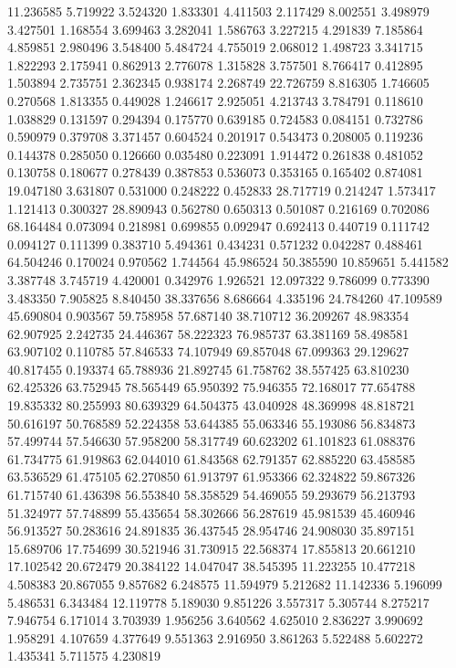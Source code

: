 11.236585
5.719922
3.524320
1.833301
4.411503
2.117429
8.002551
3.498979
3.427501
1.168554
3.699463
3.282041
1.586763
3.227215
4.291839
7.185864
4.859851
2.980496
3.548400
5.484724
4.755019
2.068012
1.498723
3.341715
1.822293
2.175941
0.862913
2.776078
1.315828
3.757501
8.766417
0.412895
1.503894
2.735751
2.362345
0.938174
2.268749
22.726759
8.816305
1.746605
0.270568
1.813355
0.449028
1.246617
2.925051
4.213743
3.784791
0.118610
1.038829
0.131597
0.294394
0.175770
0.639185
0.724583
0.084151
0.732786
0.590979
0.379708
3.371457
0.604524
0.201917
0.543473
0.208005
0.119236
0.144378
0.285050
0.126660
0.035480
0.223091
1.914472
0.261838
0.481052
0.130758
0.180677
0.278439
0.387853
0.536073
0.353165
0.165402
0.874081
19.047180
3.631807
0.531000
0.248222
0.452833
28.717719
0.214247
1.573417
1.121413
0.300327
28.890943
0.562780
0.650313
0.501087
0.216169
0.702086
68.164484
0.073094
0.218981
0.699855
0.092947
0.692413
0.440719
0.111742
0.094127
0.111399
0.383710
5.494361
0.434231
0.571232
0.042287
0.488461
64.504246
0.170024
0.970562
1.744564
45.986524
50.385590
10.859651
5.441582
3.387748
3.745719
4.420001
0.342976
1.926521
12.097322
9.786099
0.773390
3.483350
7.905825
8.840450
38.337656
8.686664
4.335196
24.784260
47.109589
45.690804
0.903567
59.758958
57.687140
38.710712
36.209267
48.983354
62.907925
2.242735
24.446367
58.222323
76.985737
63.381169
58.498581
63.907102
0.110785
57.846533
74.107949
69.857048
67.099363
29.129627
40.817455
0.193374
65.788936
21.892745
61.758762
38.557425
63.810230
62.425326
63.752945
78.565449
65.950392
75.946355
72.168017
77.654788
19.835332
80.255993
80.639329
64.504375
43.040928
48.369998
48.818721
50.616197
50.768589
52.224358
53.644385
55.063346
55.193086
56.834873
57.499744
57.546630
57.958200
58.317749
60.623202
61.101823
61.088376
61.734775
61.919863
62.044010
61.843568
62.791357
62.885220
63.458585
63.536529
61.475105
62.270850
61.913797
61.953366
62.324822
59.867326
61.715740
61.436398
56.553840
58.358529
54.469055
59.293679
56.213793
51.324977
57.748899
55.435654
58.302666
56.287619
45.981539
45.460946
56.913527
50.283616
24.891835
36.437545
28.954746
24.908030
35.897151
15.689706
17.754699
30.521946
31.730915
22.568374
17.855813
20.661210
17.102542
20.672479
20.384122
14.047047
38.545395
11.223255
10.477218
4.508383
20.867055
9.857682
6.248575
11.594979
5.212682
11.142336
5.196099
5.486531
6.343484
12.119778
5.189030
9.851226
3.557317
5.305744
8.275217
7.946754
6.171014
3.703939
1.956256
3.640562
4.625010
2.836227
3.990692
1.958291
4.107659
4.377649
9.551363
2.916950
3.861263
5.522488
5.602272
1.435341
5.711575
4.230819
